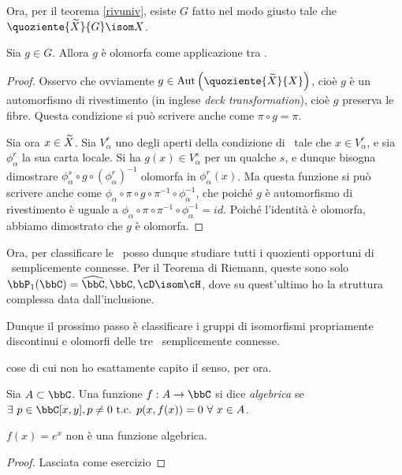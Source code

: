 Ora, per il teorema \ref{rivuniv}, esiste $G$ fatto nel modo giusto tale che $\quoziente{\ot X}{G}\isom X$.
\begin{lemma}
 	Sia $g\in G$. Allora $g$ è olomorfa come applicazione tra \sdR.
\end{lemma}
\begin{proof}
 	Osservo che ovviamente $g \in \mbox{Aut}\left(\quoziente{\ot X}{X}\right)$, cioè $g$ è un automorfismo di rivestimento (in inglese \emph{deck transformation}), cioè $g$ preserva le fibre. Questa condizione si può scrivere anche come $\pi\circ g=\pi$.
 	
 	Sia ora $x\in \widetilde{X}$. Sia $V_\alpha^r$ uno degli aperti della condizione di \sdR\ tale che $x\in V_\alpha^r$, e sia $\phi_\alpha^r$ la sua carta locale. Si ha $g(x)\in V_\alpha^s$ per un qualche $s$, e dunque bisogna dimostrare $\phi_\alpha^s\circ g\circ (\phi_\alpha^r)^{-1}$ olomorfa in $\phi_\alpha^r(x)$. Ma questa funzione si può scrivere anche come $\phi_\alpha\circ\pi\circ g\circ \pi^{-1}\circ \phi_\alpha^{-1}$, che poiché $g$ è automorfismo di rivestimento è uguale a $\phi_\alpha\circ\pi\circ\pi^{-1}\circ\phi_\alpha^{-1}=id$. Poiché l'identità è olomorfa, abbiamo dimostrato che $g$ è olomorfa.
\end{proof}

Ora, per classificare le \sdR\ posso dunque studiare tutti i quozienti opportuni di \sdR\ semplicemente connesse. Per il Teorema di Riemann, queste sono solo $\bbP_1(\bbC)=\oc \bbC, \bbC, \cD\isom\cH$, dove su quest'ultimo ho la struttura complessa data dall'inclusione.

Dunque il prossimo passo è classificare i gruppi di isomorfismi propriamente discontinui e olomorfi delle tre \sdR\ semplicemente connesse.

 cose di cui non ho esattamente capito il senso, per ora.

\begin{definizione}
	Sia $A\subset\bbC$. Una funzione $f:A\rar\bbC$ si dice \emph{algebrica} se $\exists\ p\in\bbC[x,y], p\neq0 \tc p(x,f(x))=0\ \forall\ x\in A$.
\end{definizione}
\begin{lemma}
 	$f(x)=e^x$ non è una funzione algebrica.
\end{lemma}
\begin{proof}
 	Lasciata come esercizio
\end{proof}

